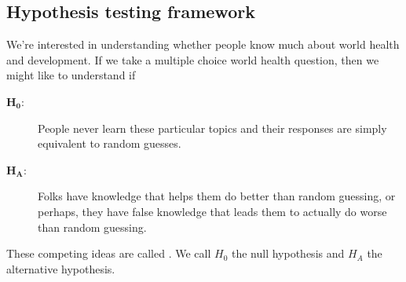 \subsection{Hypothesis testing framework}

We're interested in understanding whether people know much
about world health and development. If we take a multiple choice
world health question, then we might like to understand if
\begin{description}
\item[$\mathbf{H_0}$:]
    People never learn these particular topics and their
    responses are simply equivalent to random guesses.
\item[$\mathbf{H_A}$:]
    Folks have knowledge that helps them do better
    than random guessing, or perhaps, they have false knowledge
    that leads them to actually do worse than random guessing.
\end{description}
%
These competing ideas are called .
We call $H_0$ the null hypothesis and $H_A$ the alternative
hypothesis.


